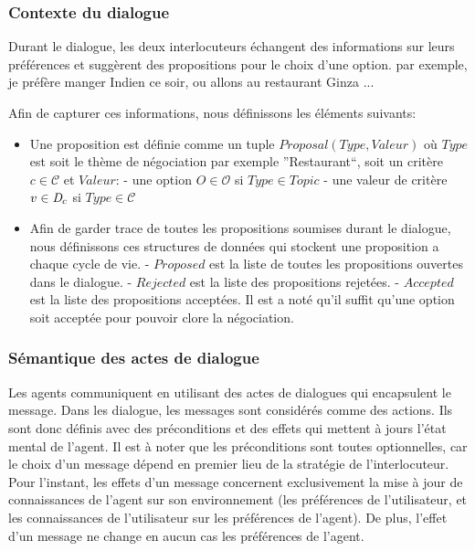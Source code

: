 \documentclass[a4paper,french]{article}
\begin{document}
\subsubsection{Contexte du dialogue}
\par Durant le dialogue, les deux interlocuteurs échangent des informations sur leurs préférences et suggèrent des propositions pour le choix d'une option. par exemple, je préfère manger Indien ce soir, ou allons au restaurant Ginza ...

Afin de capturer ces informations, nous définissons les éléments suivants:
\begin{itemize}
	\item Une proposition est définie comme un tuple $Proposal(Type, Valeur)$ où $Type$ est soit le thème de négociation par exemple ''Restaurant``, soit un critère $c \in \mathcal{C}$ et $Valeur$:
		\subitem -  une option $O \in \mathcal{O}$ si $Type \in Topic$ 
		\subitem - une valeur de critère $v \in \emph{D}_c$ si $Type \in \mathcal{C}$
	\item Afin de garder trace de toutes les propositions soumises durant le dialogue, nous définissons ces structures de données qui stockent une proposition a chaque cycle de vie. 
		\subitem - $ Proposed$ est la liste de toutes les propositions ouvertes dans le dialogue.
		\subitem - $ Rejected$  est la liste des propositions rejetées.
		\subitem - $ Accepted$  est la liste des propositions acceptées. Il est a noté qu'il suffit qu'une option soit acceptée pour pouvoir clore la négociation. 
\end{itemize}
\subsubsection{Sémantique des actes de dialogue}
\par Les agents communiquent en utilisant des actes de dialogues qui encapsulent le message. Dans les dialogue, les messages sont considérés comme des actions. Ils sont donc définis avec des préconditions et des effets qui mettent à jours l'état mental de l'agent. Il est à noter que les préconditions sont toutes optionnelles, car le choix d'un message dépend en premier lieu de la stratégie de l'interlocuteur. Pour l'instant, les effets d'un message concernent exclusivement la mise à jour de connaissances de l'agent sur son environnement (les préférences de l'utilisateur, et les connaissances de l'utilisateur sur les préférences de l'agent). De plus, l'effet d'un message ne change en aucun cas les préférences de l'agent. 
\end{document}
